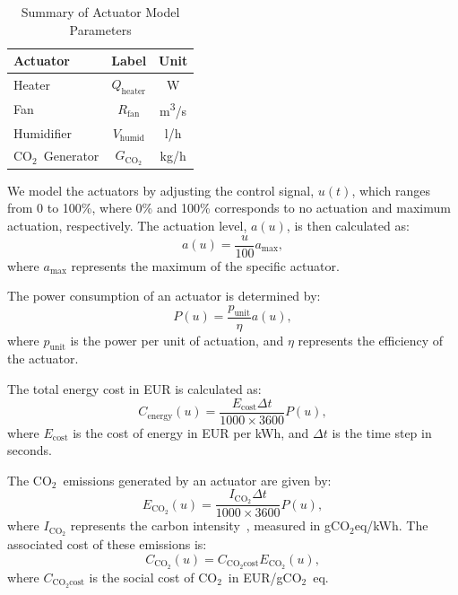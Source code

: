 \documentclass[conference]{IEEEtran}
\newcommand{\coo}{\ensuremath{\mathrm{CO_2}}}
\begin{document}
\begin{table}
    \centering
    \caption{Summary of Actuator Model Parameters}\label{tab:actuators}
    \begin{tabular}{lcc}
        \toprule
        Actuator        & Label                   & Unit                   \\
        \midrule
        Heater          & \( Q_{\text{heater}} \) & W                      \\
        Fan             & \( R_{\text{fan}} \)    & m\textsuperscript{3}/s \\
        Humidifier      & \( V_{\text{humid}} \)  & l/h                    \\
        \coo\ Generator & \( G_{\coo} \)          & kg/h                   \\
        \bottomrule
    \end{tabular}
\end{table}

We model the actuators by adjusting the control signal, \( u(t) \), which ranges from 0 to 100\%, where 0\% and 100\% corresponds to no actuation and maximum actuation, respectively. The actuation level, \( a(u) \), is then calculated as:
\begin{equation}
    a(u) = \frac{u}{100}  a_{\text{max}},
\end{equation}
where \( a_{\text{max}} \) represents the maximum of the specific actuator.

The power consumption of an actuator is determined by:
\begin{equation}
    P(u) = \frac{p_{\text{unit}}}{\eta}  a(u),
\end{equation}
where \( p_{\text{unit}} \) is the power per unit of actuation, and \( \eta \) represents the efficiency of the actuator.

The total energy cost in EUR is calculated as:
\begin{equation}
    C_{\text{energy}}(u) = \frac{E_{\text{cost}}  \Delta t}{1000 \times 3600}  P(u),
\end{equation}
where \( E_{\text{cost}} \) is the cost of energy in EUR per kWh, and \( \Delta t \) is the time step in seconds.

The \coo\ emissions generated by an actuator are given by:
\begin{equation}
    E_{\coo}(u) = \frac{I_{\coo}  \Delta t}{1000 \times 3600}  P(u),
\end{equation}
where \( I_{\coo} \) represents the carbon intensity~\cite{ElectricityMaps2022}, measured in g\coo{}eq/kWh. The associated cost of these emissions is:
\begin{equation}
    C_{\coo}(u) = C_{\coo\text{cost}}  E_{\coo}(u),
\end{equation}
where \( C_{\coo\text{cost}} \) is the social cost of \coo\ in EUR/g\coo\ eq.
\end{document}
